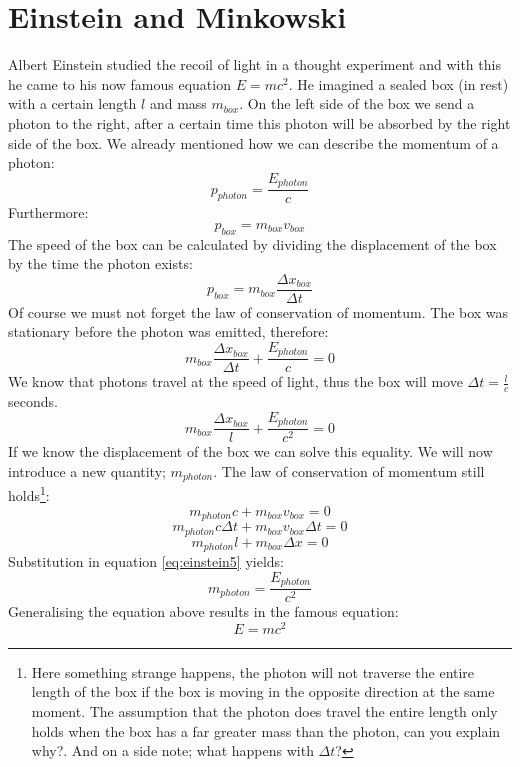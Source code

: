 \documentclass[12pt,a4paper]{article}
\numberwithin{equation}{section}
\numberwithin{figure}{section}
\numberwithin{table}{section}
\begin{document}
\section{Einstein and Minkowski}
Albert Einstein studied the recoil of light in a thought experiment and with this he came to his now famous equation $ E=mc^2$. He imagined a sealed box (in rest) with a certain length $l$ and mass $m_{box}$. On the left side of the box we send a photon to the right, after a certain time this photon will be absorbed by the right side of the box. We already mentioned how we can describe the momentum of a photon:
\begin{equation}\label{eq:einstein1}
p_{photon}=\frac{E_{photon}}{c}
\end{equation}
Furthermore:
\begin{equation}\label{eq:einstein2}
p_{box}=m_{box} v_{box}
\end{equation}
The speed of the box can be calculated by dividing the displacement of the box by the time the photon exists:
\begin{equation}\label{eq:einstein3}
p_{box}=m_{box} \frac{\Delta x_{box}}{\Delta t}
\end{equation}
Of course we must not forget the law of conservation of momentum. The box was stationary before the photon was emitted, therefore:
\begin{equation}\label{eq:einstein4}
m_{box} \frac{\Delta x_{box}}{\Delta t} + \frac{E_{photon}}{c} =0
\end{equation}
We know that photons travel at the speed of light, thus the box will move $\Delta t = \frac{l}{c}$ seconds.
\begin{equation}\label{eq:einstein5}
m_{box} \frac{\Delta x_{box}}{l} + \frac{E_{photon}}{c^2} =0
\end{equation}
If we know the displacement of the box we can solve this equality. We will now introduce a new quantity; $m_{photon}$. The law of conservation of momentum still holds\footnote{Here something strange happens, the photon will not traverse the entire length of the box if the box is moving in the opposite direction at the same moment. The assumption that the photon does travel the entire length only holds when the box has a far greater mass than the photon, can you explain why?. And on a side note; what happens with $\Delta t$?}:
\begin{equation}\label{eq:einstein6}
m_{photon} c + m_{box} v_{box} = 0
\end{equation}
\begin{equation}\label{eq:einstein7}
m_{photon} c \Delta t + m_{box} v_{box} \Delta t = 0
\end{equation}
\begin{equation}\label{eq:einstein8}
m_{photon} l + m_{box} \Delta x = 0
\end{equation}
Substitution in equation \ref{eq:einstein5} yields:
\begin{equation}\label{eq:einstein9}
m_{photon} = \frac{E_{photon}}{c^2}
\end{equation}
Generalising the equation above results in the famous equation:
\begin{equation}\label{eq:einstein10}
E=mc^2	
\end{equation}
\end{document}
